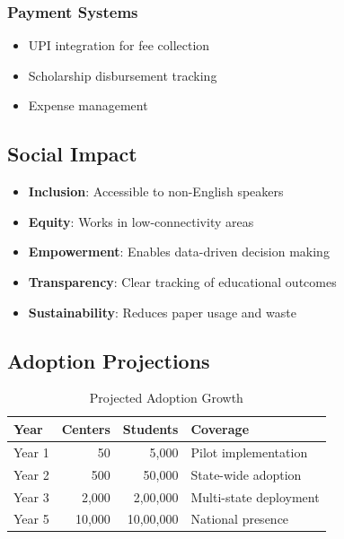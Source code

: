 \documentclass[12pt,a4paper]{article}
\newcommand{\important}[1]{\textbf{\textcolor{accent}{#1}}}
\begin{document}
\subsubsection{Payment Systems}
\begin{itemize}[leftmargin=*, itemsep=0.2em]
    \item UPI integration for fee collection
    \item Scholarship disbursement tracking
    \item Expense management
\end{itemize}

\subsection{Social Impact}
\begin{itemize}[leftmargin=*, itemsep=0.2em]
    \item \important{Inclusion}: Accessible to non-English speakers
    \item \important{Equity}: Works in low-connectivity areas
    \item \important{Empowerment}: Enables data-driven decision making
    \item \important{Transparency}: Clear tracking of educational outcomes
    \item \important{Sustainability}: Reduces paper usage and waste
\end{itemize}

\subsection{Adoption Projections}
\begin{table}[H]
\centering
\small
\begin{tabularx}{\textwidth}{|l|r|r|X|}
\hline
\rowcolor{lightgray}
\textbf{Year} & \textbf{Centers} & \textbf{Students} & \textbf{Coverage} \\
\hline
Year 1 & 50 & 5,000 & Pilot implementation \\
\hline
Year 2 & 500 & 50,000 & State-wide adoption \\
\hline
Year 3 & 2,000 & 2,00,000 & Multi-state deployment \\
\hline
Year 5 & 10,000 & 10,00,000 & National presence \\
\hline
\end{tabularx}
\caption{Projected Adoption Growth}
\end{table}

\newpage
\end{document}
